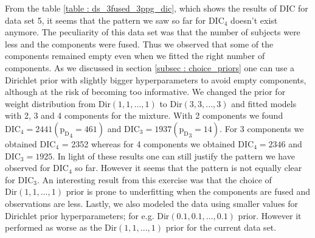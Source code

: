 From the table \ref{table : ds_3fused_3ppg_dic}, which shows the results of DIC for data set 5, it seems that the pattern we saw so far for $\text{DIC}_4$ doesn't exist anymore. The peculiarity of this data set was that the number of subjects were less and the components were fused. Thus we observed that some of the components remained empty even when we fitted the right number of components. As we discussed in section \ref{subsec : choice_priors} one can use a Dirichlet prior with slightly bigger hyperparameters to avoid empty components, although at the risk of becoming too informative. We changed the prior for weight distribution from $\text{Dir}(1, 1, ..., 1)$ to $\text{Dir}(3, 3, ..., 3)$ and fitted models with 2, 3 and 4 components for the mixture. With 2 components we found $\text{DIC}_4 = 2441 ({\text{p}_\text{D}}_4 = 461)$ and $\text{DIC}_3 = 1937 ({\text{p}_\text{D}}_3 = 14)$. For 3 components we obtained $\text{DIC}_4$ = 2352 whereas for 4 components we obtained $\text{DIC}_4 = 2346$ and $\text{DIC}_3 = 1925$. In light of these results one can still justify the pattern we have observed for $\text{DIC}_4$ so far. However it seems that the pattern is not equally clear for $\text{DIC}_3$. An interesting result from this exercise was that the choice of $\text{Dir}(1, 1, ..., 1)$ prior is prone to underfitting when the components are fused and observations are less. Lastly, we also modeled the data using smaller values for Dirichlet prior hyperparameters; for e.g. $\text{Dir}(0.1, 0.1, ..., 0.1)$ prior. However it performed as worse as the $\text{Dir}(1, 1, ..., 1)$ prior for the current data set.\\

